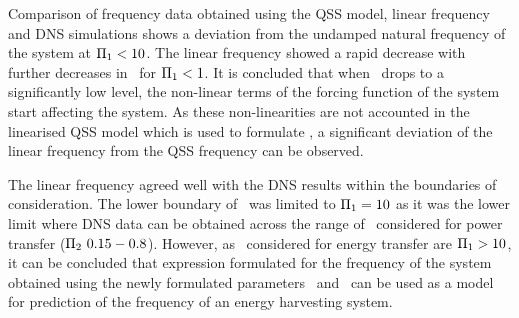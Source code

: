 Comparison of frequency data obtained using the QSS model, linear frequency and DNS simulations shows a deviation from the undamped natural frequency of the system at $\Pi_1<10$. The linear frequency showed a rapid decrease with further decreases in \massstiff\ for $\Pi_1<1$. It is concluded that when \massstiff\ drops to a significantly low level, the non-linear terms of the forcing function of the system start affecting the system. As these non-linearities are not accounted in the linearised QSS model which is used to formulate \freqlin, a significant deviation of the linear frequency from the QSS frequency can be observed.

The linear frequency agreed well with the DNS results within the boundaries of consideration. The lower boundary of \massstiff\ was limited to $\Pi_1=10$ as it was the lower limit where DNS data can be obtained across the range of \massdamp\ considered for power transfer ($\Pi_2\ 0.15-0.8$). However, as \massstiff\ considered for energy transfer are $\Pi_1>10$, it can be concluded that expression formulated for the frequency of the system obtained using the newly formulated parameters \massstiff\ and \massdamp\ can be used as a model for prediction of the frequency of an energy harvesting system.  
 
 










